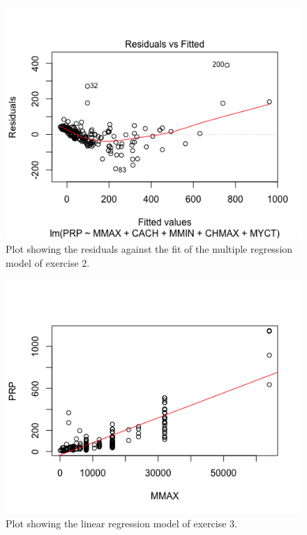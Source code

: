 \documentclass{paper}
\begin{document}
\begin{figure}
  \begin{center}
    \quad\quad
    \includegraphics[width=.8\linewidth]{res2}
  \end{center}
  \caption{Plot showing the residuals against the fit of the multiple regression
   model of exercise 2.}
   \label{fig:res2}
\end{figure}

\begin{figure}
  \begin{center}
    \quad\quad
    \includegraphics[width=.8\linewidth]{ex3}
  \end{center}
  \caption{Plot showing the linear regression
   model of exercise 3.}
   \label{fig:ex3}
\end{figure}
\end{document}

